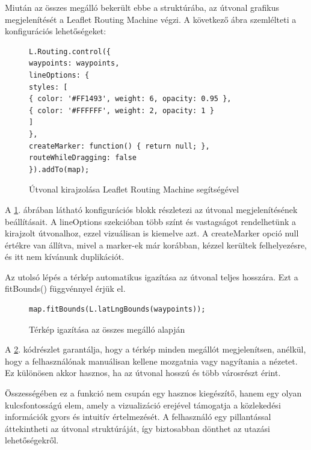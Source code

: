 Miután az összes megálló bekerült ebbe a struktúrába, az útvonal grafikus megjelenítését a Leaflet Routing Machine végzi. A következő ábra szemlélteti a konfigurációs lehetőségeket:

\begin{figure}[H]
\caption{Útvonal kirajzolása Leaflet Routing Machine segítségével}
\label{fig:routing-control}
\begin{minipage}{\textwidth}
\begin{BVerbatim}
L.Routing.control({
waypoints: waypoints,
lineOptions: {
styles: [
{ color: '#FF1493', weight: 6, opacity: 0.95 },
{ color: '#FFFFFF', weight: 2, opacity: 1 }
]
},
createMarker: function() { return null; },
routeWhileDragging: false
}).addTo(map);
\end{BVerbatim}
\end{minipage}
\end{figure}

A \ref{fig:routing-control}. ábrában látható konfigurációs blokk részletezi az útvonal megjelenítésének beállításait. A lineOptions szekcióban több színt és vastagságot rendelhetünk a kirajzolt útvonalhoz, ezzel vizuálisan is kiemelve azt. A createMarker opció null értékre van állítva, mivel a marker-ek már korábban, kézzel kerültek felhelyezésre, és itt nem kívánunk duplikációt.

Az utolsó lépés a térkép automatikus igazítása az útvonal teljes hosszára. Ezt a fitBounds() függvénnyel érjük el.

\begin{figure}[H]
\caption{Térkép igazítása az összes megálló alapján}
\label{fig:fit-bounds}
\begin{minipage}{\textwidth}
\begin{BVerbatim}
map.fitBounds(L.latLngBounds(waypoints));
\end{BVerbatim}
\end{minipage}
\end{figure}

A \ref{fig:fit-bounds}. kódrészlet garantálja, hogy a térkép minden megállót megjelenítsen, anélkül, hogy a felhasználónak manuálisan kellene mozgatnia vagy nagyítania a nézetet. Ez különösen akkor hasznos, ha az útvonal hosszú és több városrészt érint.

Összességében ez a funkció nem csupán egy hasznos kiegészítő, hanem egy olyan kulcsfontosságú elem, amely a vizualizáció erejével támogatja a közlekedési információk gyors és intuitív értelmezését. A felhasználó egy pillantással áttekintheti az útvonal struktúráját, így biztosabban dönthet az utazási lehetőségekről.


